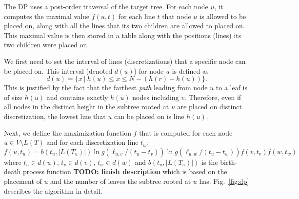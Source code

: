 \documentclass{llncs}
\begin{document}
The DP uses a post-order traversal of the target tree. For each node $u$, it
computes the maximal value $f(u,t)$ for each line $t$ that node $u$ is allowed to be
placed on, along with all the lines that its two children are allowed to placed
on. This maximal value is then stored in a table along with the positions (lines) its
two children were placed on. 

We first need to set the interval of lines (discretizations) that a specific
node can be placed on.  This interval (denoted $d(u)$) for node $u$ is defined
as $$ d(u) = \{ x\ |\  h(u) \leq x \leq N - (h(r) - h(u))\}.$$  This is
justified by the fact that the farthest {\em path} leading from node $u$ to a
leaf is of size $h(u)$ and contains exactly $h(u)$ nodes including $v$.
Therefore, even if all nodes in the distinct height in the subtree rooted at
$u$ are placed on distinct discretization, the lowest line that $u$ can be
placed on is line $h(u)$.

Next, we define the maximization function $f$ that is computed for each node $u \in
V\setminus L(T)$ and for each discretization line $t_u$:  
$$ f(u,t_u) = b(t_u,|L(T_u)|) \ln g(\ell_{u,v} / (t_u - t_v)) \ln g(\ell_{u,w} / (t_u -
t_w)) f(v,t_v) f(w,t_w) $$ where $t_u \in d(u)$, $t_v \in d(v)$, $t_w \in
d(w)$ and $b(t_u,|L(T_u)|)$ is the birth-death process function {\bf TODO:
finish description} which is based on the placement of $u$ and the number of
leaves the subtree rooted at $u$ has.
Fig.~\ref{fig:dp} describes the algorithm in detail.
\end{document}
